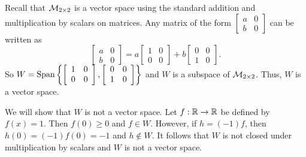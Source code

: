 \begin{example}
	\item Recall that $\mathcal{M}_{2 \times 2}$ is a vector space using the standard addition and multiplication by scalars on matrices. Any matrix of the form $\left[ \begin{array}{cc} a&0\\b&0 \end{array} \right]$  can be written as 
	\[\left[ \begin{array}{cc} a&0\\b&0 \end{array} \right] = a\left[ \begin{array}{cc} 1&0\\0&0 \end{array} \right]  + b \left[ \begin{array}{cc} 0&0\\1&0 \end{array} \right].\]
	So $W = \text{Span}\left\{\left[ \begin{array}{cc} 1&0\\0&0 \end{array} \right],  \left[ \begin{array}{cc} 0&0\\1&0 \end{array} \right]\right\}$ and $W$ is a subspace of $\mathcal{M}_{2 \times 2}$. Thus, $W$ is a vector space. 
	
	\item We will show that $W$ is not a vector space. Let $f: \mathbb{R} \to \mathbb{R}$ be defined by $f(x) = 1$. Then $f(0) \geq 0$ and $f \in W$. However, if $h = (-1)f$, then $h(0) = (-1)f(0) = -1$ and $h \notin W$. It follows that $W$ is not closed under multiplication by scalars and $W$ is not a vector space. 
	
	\ea
	
\end{example}

